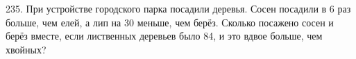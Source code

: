 235. При устройстве городского парка посадили деревья. Сосен посадили в 6 раз больше, чем елей, а лип на 30 меньше, чем берёз. Сколько посажено сосен и берёз вместе, если лиственных деревьев было 84, и это вдвое больше, чем хвойных?\\
